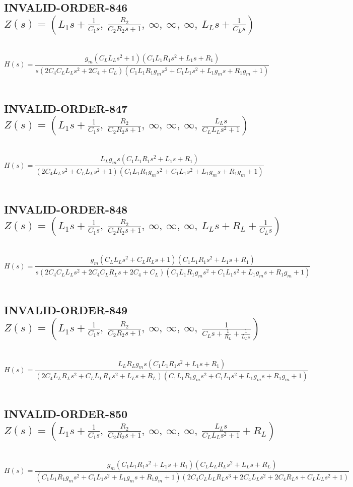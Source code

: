 \documentclass{article}
\begin{document}
\subsection{INVALID-ORDER-846 $Z(s) = \left( L_{1} s + \frac{1}{C_{1} s}, \  \frac{R_{2}}{C_{2} R_{2} s + 1}, \  \infty, \  \infty, \  \infty, \  L_{L} s + \frac{1}{C_{L} s}\right)$ } \ 
\textbf{\[H(s) = \frac{g_{m} \left(C_{L} L_{L} s^{2} + 1\right) \left(C_{1} L_{1} R_{1} s^{2} + L_{1} s + R_{1}\right)}{s \left(2 C_{4} C_{L} L_{L} s^{2} + 2 C_{4} + C_{L}\right) \left(C_{1} L_{1} R_{1} g_{m} s^{2} + C_{1} L_{1} s^{2} + L_{1} g_{m} s + R_{1} g_{m} + 1\right)}\] } \ 
\subsection{INVALID-ORDER-847 $Z(s) = \left( L_{1} s + \frac{1}{C_{1} s}, \  \frac{R_{2}}{C_{2} R_{2} s + 1}, \  \infty, \  \infty, \  \infty, \  \frac{L_{L} s}{C_{L} L_{L} s^{2} + 1}\right)$ } \ 
\textbf{\[H(s) = \frac{L_{L} g_{m} s \left(C_{1} L_{1} R_{1} s^{2} + L_{1} s + R_{1}\right)}{\left(2 C_{4} L_{L} s^{2} + C_{L} L_{L} s^{2} + 1\right) \left(C_{1} L_{1} R_{1} g_{m} s^{2} + C_{1} L_{1} s^{2} + L_{1} g_{m} s + R_{1} g_{m} + 1\right)}\] } \ 
\subsection{INVALID-ORDER-848 $Z(s) = \left( L_{1} s + \frac{1}{C_{1} s}, \  \frac{R_{2}}{C_{2} R_{2} s + 1}, \  \infty, \  \infty, \  \infty, \  L_{L} s + R_{L} + \frac{1}{C_{L} s}\right)$ } \ 
\textbf{\[H(s) = \frac{g_{m} \left(C_{L} L_{L} s^{2} + C_{L} R_{L} s + 1\right) \left(C_{1} L_{1} R_{1} s^{2} + L_{1} s + R_{1}\right)}{s \left(2 C_{4} C_{L} L_{L} s^{2} + 2 C_{4} C_{L} R_{L} s + 2 C_{4} + C_{L}\right) \left(C_{1} L_{1} R_{1} g_{m} s^{2} + C_{1} L_{1} s^{2} + L_{1} g_{m} s + R_{1} g_{m} + 1\right)}\] } \ 
\subsection{INVALID-ORDER-849 $Z(s) = \left( L_{1} s + \frac{1}{C_{1} s}, \  \frac{R_{2}}{C_{2} R_{2} s + 1}, \  \infty, \  \infty, \  \infty, \  \frac{1}{C_{L} s + \frac{1}{R_{L}} + \frac{1}{L_{L} s}}\right)$ } \ 
\textbf{\[H(s) = \frac{L_{L} R_{L} g_{m} s \left(C_{1} L_{1} R_{1} s^{2} + L_{1} s + R_{1}\right)}{\left(2 C_{4} L_{L} R_{L} s^{2} + C_{L} L_{L} R_{L} s^{2} + L_{L} s + R_{L}\right) \left(C_{1} L_{1} R_{1} g_{m} s^{2} + C_{1} L_{1} s^{2} + L_{1} g_{m} s + R_{1} g_{m} + 1\right)}\] } \ 
\subsection{INVALID-ORDER-850 $Z(s) = \left( L_{1} s + \frac{1}{C_{1} s}, \  \frac{R_{2}}{C_{2} R_{2} s + 1}, \  \infty, \  \infty, \  \infty, \  \frac{L_{L} s}{C_{L} L_{L} s^{2} + 1} + R_{L}\right)$ } \ 
\textbf{\[H(s) = \frac{g_{m} \left(C_{1} L_{1} R_{1} s^{2} + L_{1} s + R_{1}\right) \left(C_{L} L_{L} R_{L} s^{2} + L_{L} s + R_{L}\right)}{\left(C_{1} L_{1} R_{1} g_{m} s^{2} + C_{1} L_{1} s^{2} + L_{1} g_{m} s + R_{1} g_{m} + 1\right) \left(2 C_{4} C_{L} L_{L} R_{L} s^{3} + 2 C_{4} L_{L} s^{2} + 2 C_{4} R_{L} s + C_{L} L_{L} s^{2} + 1\right)}\] } \ 
\end{document}
